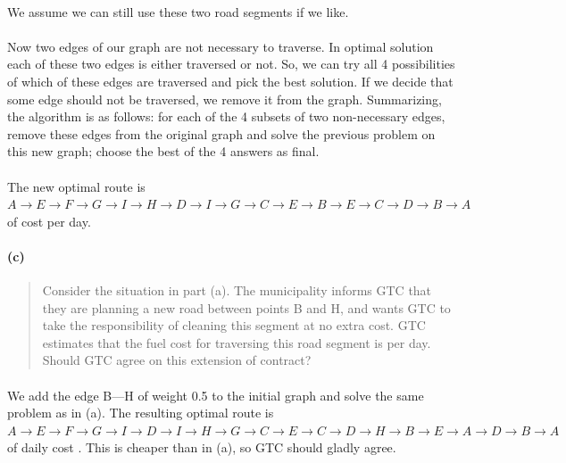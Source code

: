 \paragraph{}
We assume we can still use these two road segments if we like.

\paragraph{}
Now two edges of our graph are not necessary to traverse. In optimal solution each of these two edges is either traversed or not. So, we can try all 4 possibilities of which of these edges are traversed and pick the best solution. If we decide that some edge should not be traversed, we remove it from the graph. Summarizing, the algorithm is as follows: for each of the 4 subsets of two non-necessary edges, remove these edges from the original graph and solve the previous problem on this new graph; choose the best of the 4 answers as final.

\paragraph{}
The new optimal route is $A \rightarrow E \rightarrow F \rightarrow G \rightarrow I \rightarrow H \rightarrow D \rightarrow I \rightarrow G \rightarrow C \rightarrow E \rightarrow B \rightarrow E \rightarrow C \rightarrow D \rightarrow B \rightarrow A$ of cost  per day.

\paragraph{(c)}
\begin{quote}
Consider the situation in part (a). The municipality informs GTC that they are planning a new road between points B and H, and wants GTC to take the responsibility of cleaning this segment at no extra cost. GTC estimates that the fuel cost for traversing this road segment is  per day. Should GTC agree on this extension of contract?
\end{quote}

\paragraph{}
We add the edge B---H of weight 0.5 to the initial graph and solve the same problem as in (a). The resulting optimal route is $A \rightarrow E \rightarrow F \rightarrow G \rightarrow I \rightarrow D \rightarrow I \rightarrow H \rightarrow G \rightarrow C \rightarrow E \rightarrow C \rightarrow D \rightarrow H \rightarrow B \rightarrow E \rightarrow A \rightarrow D \rightarrow B \rightarrow A$ of daily cost . This is  cheaper than in (a), so GTC should gladly agree.

